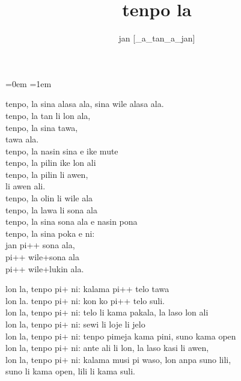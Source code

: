 \documentclass{article}
\title{tenpo la}
\author{jan {[}\_a\_tan\_a\_jan{]}}
\date{}
\begin{document}
\parindent=0em
\parskip=1em
\large

\maketitle
tenpo, la sina alasa ala, sina wile alasa ala. \\
tenpo, la tan li lon ala, \\
tenpo, la sina tawa, \\
tawa ala. \\

tenpo, la nasin sina e ike mute \\
tenpo, la pilin ike lon ali \\
tenpo, la pilin li awen, \\
li awen ali. \\

tenpo, la olin li wile ala \\
tenpo, la lawa li sona ala \\
tenpo, la sina sona ala e nasin pona \\

tenpo, la sina poka e ni: \\
jan pi++ sona ala, \\
pi++ wile+sona ala \\
pi++ wile+lukin ala. \\

\bigskip


lon la, tenpo pi+ ni: kalama pi++ telo tawa \\
lon la. tenpo pi+ ni: kon ko pi++ telo suli. \\
lon la, tenpo pi+ ni: telo li kama pakala, la laso lon ali \\

lon la, tenpo pi+ ni: sewi li loje li jelo \\
lon la, tenpo pi+ ni: tenpo pimeja kama pini, suno kama open \\
lon la, tenpo pi+ ni: ante ali li lon, la laso kasi li awen,  \\
lon la, tenpo pi+ ni: kalama musi pi waso, lon anpa suno lili, \\
suno li kama open, lili li kama suli.
\end{document}
